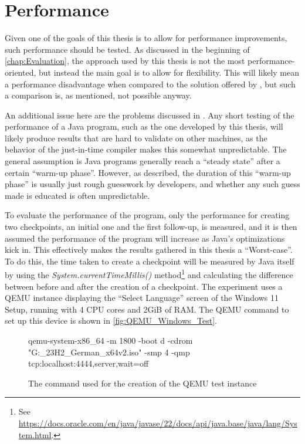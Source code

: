 \section{Performance}\label{sec:eval_performance}
Given one of the goals of this thesis is to allow for performance improvements,
such performance should be tested.
As discussed in the beginning of \autoref{chap:Evaluation},
the approach used by this thesis is not the most performance-oriented,
but instead the main goal is to allow for flexibility.
This will likely mean a performance disadvantage when compared to the solution offered by \citeauthor{kitcheckpoints},
but such a comparison is, as mentioned, not possible anyway.

An additional issue here are the problems \citeauthor{Java_Benchmarking} discussed in \cite{Java_Benchmarking}.
Any short testing of the performance of a Java program, such as the one developed by this thesis,
will likely produce results that are hard to validate on other machines,
as the behavior of the just-in-time compiler makes this somewhat unpredictable.
The general assumption is Java programs generally reach a \enquote{steady state} after a certain \enquote{warm-up phase}.
However, as \citeauthor{Java_Benchmarking} described, the duration of this \enquote{warm-up phase}
is usually just rough guesswork by developers,
and whether any such guess made is educated is often unpredictable\cite{Java_Benchmarking}.

To evaluate the performance of the program,
only the performance for creating two checkpoints,
an initial one and the first follow-up,
is measured, and it is then assumed the performance of the program will increase as Java's optimizations kick in.
This effectively makes the results gathered in this thesis a \enquote{Worst-case}.
To do this, the time taken to create a checkpoint will be measured by Java itself
by using the \emph{System.currentTimeMillis()} method\footnote{See \href{https://docs.oracle.com/en/java/javase/22/docs/api/java.base/java/lang/System.html#currentTimeMillis()}{https://docs.oracle.com/en/java/javase/22/docs/api/java.base/java/lang/System.html}.}
and calculating the difference between before and after the creation of a checkpoint.
The experiment uses a QEMU instance displaying the \enquote{Select Language} screen of the Windows 11 Setup,
running with 4 CPU cores and 2GiB of RAM.
The QEMU command to set up this device is shown in \autoref{fig:QEMU_Windows_Test}.

\begin{figure}[h]
    \begin{ffcode}
        qemu-system-x86_64 -m 1800 -boot d -cdrom "G:_23H2_German_x64v2.iso" -smp 4 -qmp tcp:localhost:4444,server,wait=off
    \end{ffcode}
    \label{fig:QEMU_Windows_Test}
    \caption{The command used for the creation of the QEMU test instance}
\end{figure}

